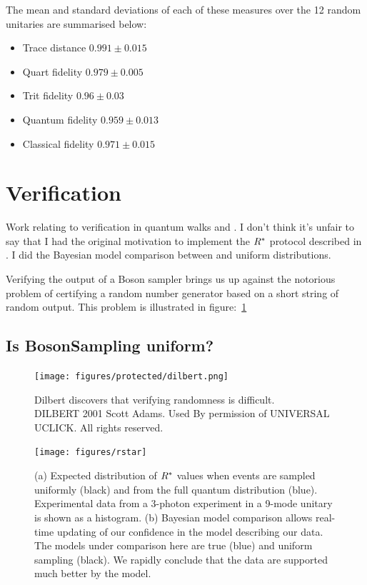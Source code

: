 The mean and standard deviations of each of these measures over the 12 random
unitaries are summarised below:
\begin{itemize}
  \item Trace distance \(0.991\pm0.015\)
  \item Quart fidelity \(0.979\pm0.005\)
  \item Trit fidelity \(0.96\pm0.03\)
  \item Quantum fidelity \(0.959\pm0.013\)
  \item Classical fidelity \(0.971\pm0.015\)
\end{itemize}


\section{Verification}
\label{sec:Verification}
Work relating to verification in quantum walks and \bosonsampling{}. I don't
think it's unfair to say that I had the original motivation to implement the
\(\rstar\) protocol described in \cite{notuniform}. I did the Bayesian model
comparison between \bosonsampling{} and uniform distributions.

Verifying the output of a Boson sampler brings us up against the notorious
problem of certifying a random number generator based on a short string of
random output. This problem is illustrated in figure:~\ref{fig:dilbert}

\subsection{Is BosonSampling uniform?}
\label{sec:RStar}
\begin{figure}[t]
  \centering
  \texttt{[image: figures/protected/dilbert.png]}
  \caption[Dilbert discovers that verifying randomness is difficult.]
  {Dilbert discovers that verifying randomness is difficult.\\DILBERT
  \textcopyright{} 2001 Scott Adams. Used By permission of UNIVERSAL UCLICK. All
  rights reserved.}
  \label{fig:dilbert}
\end{figure}

\begin{figure}[t]
  \centering
  \texttt{[image: figures/rstar]}
  \caption[Using the $\rstar$ discriminator to verify BosonSampling]
  {(a) Expected distribution of \(\rstar\) values when events are sampled
  uniformly (black) and from the full quantum distribution (blue). Experimental
  data from a 3-photon experiment in a 9-mode unitary is shown as a histogram.
  (b) Bayesian model comparison allows real-time updating of our confidence in
  the model describing our data. The models under comparison here are true
  \bosonsampling{} (blue) and uniform sampling (black). We rapidly conclude that
  the data are supported much better by the \bosonsampling{} model.}
\end{figure}

